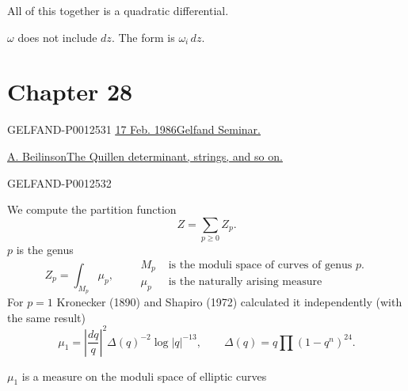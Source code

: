 All of this together is a quadratic differential.

$\omega$ does not include $dz$. The form is $\omega_i\,dz$.


\clearpage
{}
\section*{Chapter 28}
\begin{GelfandAdjacentEvidence}{GELFAND-P001253}{1}
\underline{\underline{17 Feb. 1986}}\qquad\underline{Gelfand Seminar.}

\underline{\underline{A. Beilinson}} \underline{The Quillen determinant, strings, and so on.}
\end{GelfandAdjacentEvidence}
\begin{GelfandAdjacentEvidence}{GELFAND-P001253}{2}


We compute the partition function
\begin{equation*}
Z=\sum_{p\geq0}Z_p.\tag{1}
\end{equation*}
$p$ is the genus
\begin{equation*}
Z_p=\int_{M_p}\mu_p,\qquad
\begin{aligned}
M_p&\text{ is the moduli space of curves of genus }p.\\
\mu_p&\text{ is the naturally arising measure}
\end{aligned}\tag{2}
\end{equation*}
For $p=1$ Kronecker (1890) and Shapiro (1972) calculated it independently (with the same result)
\begin{equation*}
\mu_1=\left|\frac{dq}{q}\right|^2\Delta(q)^{-2}\log|q|^{-13},
\qquad \Delta(q)=q\prod(1-q^n)^{24}.\tag{3}
\end{equation*}
\end{GelfandAdjacentEvidence}


$\mu_1$ is a measure on the moduli space of elliptic curves

